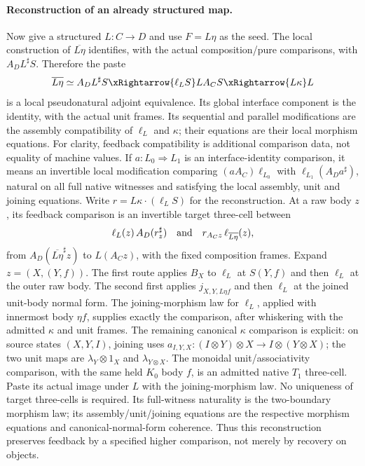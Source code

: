 \documentclass{article}
\begin{document}
\paragraph{Reconstruction of an already structured map.} Now give a structured $L:C\to D$ and use $F=L\eta$ as the seed. The local construction of $\overline{L\eta}$ identifies, with the actual composition/pure comparisons, with $A_D L^\sharp S$. Therefore the paste
\[
 \overline{L\eta}
 \simeq A_D L^\sharp S
 \xRightarrow{\ell_L S}L A_C S
 \xRightarrow{L\kappa}L
\]
is a local pseudonatural adjoint equivalence. Its global interface component is the identity, with the actual unit frames. Its sequential and parallel modifications are the assembly compatibility of $\ell_L$ and $\kappa$; their equations are their local morphism equations. For clarity, feedback compatibility is additional comparison data, not equality of machine values. If $a:L_0\Rightarrow L_1$ is an interface-identity comparison, it means an invertible local modification comparing $(a A_C)\ell_{L_0}$ with $\ell_{L_1}(A_Da^\sharp)$, natural on all full native witnesses and satisfying the local assembly, unit and joining equations. Write $r=L\kappa\cdot(\ell_L S)$ for the reconstruction. At a raw body $z$, its feedback comparison is an invertible target three-cell between
\[
 \ell_L(z)\,A_D(r^\sharp_z)
 \quad\hbox{and}\quad
 r_{A_Cz}\,\ell_{\overline{L\eta}}(z),
\]
from $A_D(\overline{L\eta}^{\sharp}z)$ to $L(A_Cz)$, with the fixed composition frames. Expand $z=(X,(Y,f))$. The first route applies $B_X$ to $\ell_L$ at $S(Y,f)$ and then $\ell_L$ at the outer raw body. The second first applies $j_{X,Y,L\eta f}$ and then $\ell_L$ at the joined unit-body normal form. The joining-morphism law for $\ell_L$, applied with innermost body $\eta f$, supplies exactly the comparison, after whiskering with the admitted $\kappa$ and unit frames. The remaining canonical $\kappa$ comparison is explicit: on source states $(X,Y,I)$, joining uses $a_{I,Y,X}:(I\otimes Y)\otimes X\to I\otimes(Y\otimes X)$; the two unit maps are $\lambda_Y\otimes1_X$ and $\lambda_{Y\otimes X}$. The monoidal unit/associativity comparison, with the same held $K_0$ body $f$, is an admitted native $T_1$ three-cell. Paste its actual image under $L$ with the joining-morphism law. No uniqueness of target three-cells is required. Its full-witness naturality is the two-boundary morphism law; its assembly/unit/joining equations are the respective morphism equations and canonical-normal-form coherence. Thus this reconstruction preserves feedback by a specified higher comparison, not merely by recovery on objects.
\end{document}
